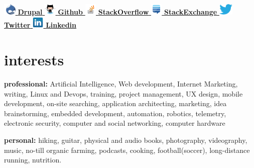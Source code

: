 \documentclass[]{friggeri-cv} %
\begin{document}
	
    \href{http://drupal.org/user/34622}{\includegraphics[height=16pt]{druplicon.png}  \textbf{Drupal }} \href{https://github.com/frazras}{\includegraphics[height=16pt]{octocat.png}  \textbf{Github }}
    \href{http://stackoverflow.com/users/1106420/frazras}{\includegraphics[height=16pt]{stackoverflow.png}  \textbf{StackOverflow }}
    \href{http://stackexchange.com/users/530574/frazras?tab=accounts}{\includegraphics[height=16pt]{stackexchange.png}  \textbf{StackExchange }}
    \href{http://twitter.com/frazras}{\includegraphics[height=16pt]{twitter.eps}  \textbf{Twitter }}
    \href{http://jm.linkedin.com/in/rohansmith}{\includegraphics[height=16pt]{linkedin.png}  \textbf{Linkedin }}


\section{interests}

\textbf{professional:} Artificial Intelligence, Web development, Internet Marketing, writing, Linux and Devops, training, project management, UX design, mobile development, on-site searching, application architecting, marketing, idea brainstorming, embedded development, automation, robotics, telemetry, electronic security, computer and social networking, computer hardware

\textbf{personal:} hiking, guitar, physical and audio books, photography, videography, music, no-till organic farming, podcasts, cooking, football(soccer), long-distance running, nutrition.
\end{document}
